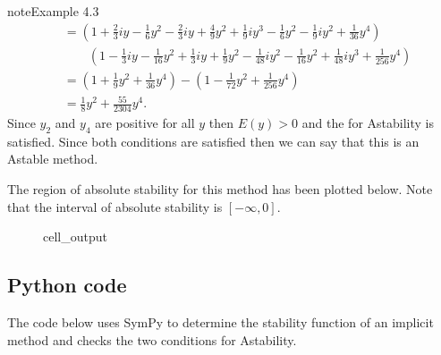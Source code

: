 \documentclass[letterpaper,10pt,english]{jupyterBook}
\begin{document}
\begin{sphinxadmonition}{note}{Example 4.3}
\begin{align*}
    &= \left( 1 + \frac{2}{3}iy - \frac{1}{6}y^2 - \frac{2}{3} i y + \frac{4}{9}y^2 + \frac{1}{9} i y^3 - \frac{1}{6}y^2 - \frac{1}{9} i y^2 + \frac{1}{36} y^4 \right) \\
    & \qquad \left( 1 - \frac{1}{3} i y - \frac{1}{16}y^2 + \frac{1}{3} i y + \frac{1}{9} y^2 - \frac{1}{48} i y^2 - \frac{1}{16} y^2 + \frac{1}{48} i y^3 + \frac{1}{256} y^4 \right) \\
    &= \left( 1 + \frac{1}{9} y^2 + \frac{1}{36} y^4 \right) - \left( 1 - \frac{1}{72} y^2 + \frac{1}{256} y^4 \right) \\
    &= \frac{1}{8} y^2 + \frac{55}{2304} y^4.
\end{align*}
\sphinxAtStartPar
Since \(y_2\) and \(y_4\) are positive for all \(y\) then \(E(y)>0\) and the {\hyperref[\detokenize{4_Stability/4.3_IRK_stability_function:a-stability-theorem}]{}} for A\sphinxhyphen{}stability is satisfied. Since both conditions are satisfied then we can say that this is an A\sphinxhyphen{}stable method.

\sphinxAtStartPar
The region of absolute stability for this method has been plotted below. Note that the interval of absolute stability is \([-\infty, 0]\).

\begin{figure}[H]
\centering
\begin{sphinxVerbatimOutput}

\begin{sphinxuseclass}{cell_output}
\noindent{}

\end{sphinxuseclass}\end{sphinxVerbatimOutput}
\end{figure}
\end{sphinxadmonition}


\subsection{Python code}
\label{\detokenize{4_Stability/4.3_IRK_stability_function:python-code}}
\sphinxAtStartPar
The code below uses SymPy to determine the stability function of an implicit method and checks the two conditions for A\sphinxhyphen{}stability.
\end{document}
